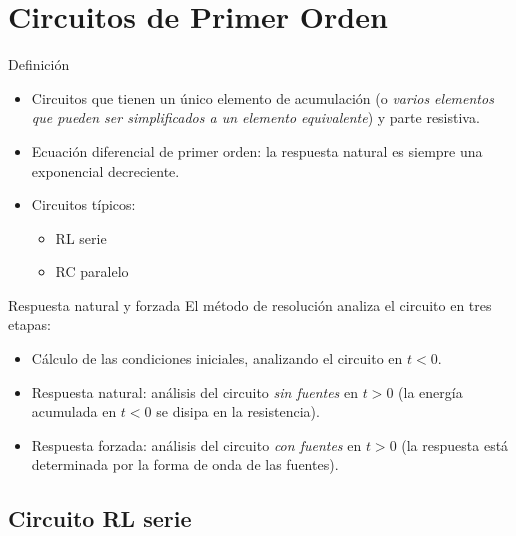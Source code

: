 \documentclass[aspectratio=169, usenames,svgnames,dvipsnames]{beamer}
\begin{document}
\section{Circuitos de Primer Orden}
\label{sec:org6e7f591}
\begin{frame}[label={sec:orgaf29885}]{Definición}
\begin{itemize}
\item Circuitos que tienen un \alert{único elemento de acumulación} (o \emph{varios elementos que pueden ser simplificados a un elemento equivalente}) y parte resistiva.
\end{itemize}
\vfill
\begin{itemize}
\item \alert{Ecuación diferencial de primer orden}: la respuesta natural es siempre una \alert{exponencial decreciente}.
\end{itemize}
\vfill
\begin{itemize}
\item Circuitos típicos:
\begin{itemize}
\item RL serie
\item RC paralelo
\end{itemize}
\end{itemize}
\end{frame}
\begin{frame}[label={sec:org79f9a79}]{Respuesta natural y forzada}
El método de resolución analiza el circuito en tres etapas:
  \vfill
\begin{itemize}
\item Cálculo de las \alert{condiciones iniciales}, analizando el circuito en \(t < 0\).
\end{itemize}
\vfill   
\begin{itemize}
\item \alert{Respuesta natural}: análisis del circuito \emph{sin fuentes} en \(t > 0\) (la energía acumulada en \(t < 0\) se disipa en la resistencia).
\end{itemize}
\vfill   
\begin{itemize}
\item \alert{Respuesta forzada}: análisis del circuito \emph{con fuentes} en \(t > 0\) (la respuesta está determinada por la forma de onda de las fuentes).
\end{itemize}
\end{frame}
\subsection{Circuito RL serie}
\label{sec:org81bde12}
\end{document}
